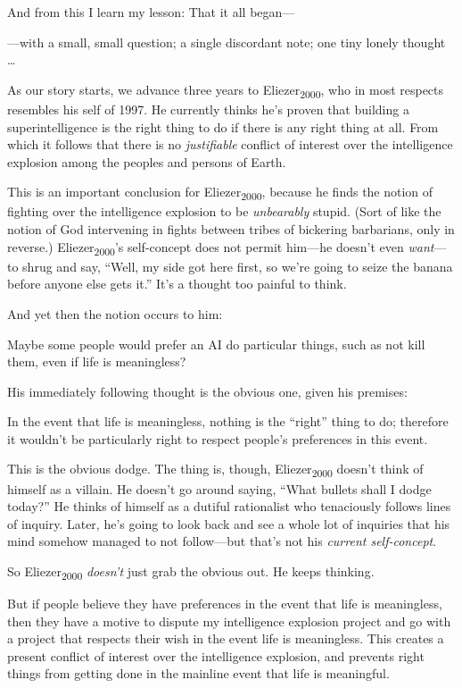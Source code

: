 {
 And from this I learn my lesson: That it all began---}

{
 {}---with a small, small question; a single discordant note; one
tiny lonely thought \ldots}

{
 As our story starts, we advance three years to
Eliezer\textsubscript{2000}, who in most respects resembles his self of
1997. He currently thinks he's proven that building a
superintelligence is the right thing to do if there is any right thing
at all. From which it follows that there is no \textit{justifiable}
conflict of interest over the intelligence explosion among the peoples
and persons of Earth.}

{
 This is an important conclusion for Eliezer\textsubscript{2000},
because he finds the notion of fighting over the intelligence explosion
to be \textit{unbearably} stupid. (Sort of like the notion of God
intervening in fights between tribes of bickering barbarians, only in
reverse.) Eliezer\textsubscript{2000}'s self-concept
does not permit him---he doesn't even
\textit{want}{}---to shrug and say, ``Well, my side
got here first, so we're going to seize the banana
before anyone else gets it.'' It's a
thought too painful to think.}

{
 And yet then the notion occurs to him:}

{
 Maybe some people would prefer an AI do particular things, such as
not kill them, even if life is meaningless?}

{
 His immediately following thought is the obvious one, given his
premises:}

{
 In the event that life is meaningless, nothing is the
``right'' thing to do; therefore it
wouldn't be particularly right to respect
people's preferences in this event.}

{
 This is the obvious dodge. The thing is, though,
Eliezer\textsubscript{2000} doesn't think of himself as
a villain. He doesn't go around saying,
``What bullets shall I dodge
today?'' He thinks of himself as a dutiful
rationalist who tenaciously follows lines of inquiry. Later,
he's going to look back and see a whole lot of
inquiries that his mind somehow managed to not follow---but
that's not his \textit{current self-concept}.}

{
 So Eliezer\textsubscript{2000} \textit{doesn't}
just grab the obvious out. He keeps thinking.}

{
 But if people believe they have preferences in the event that life
is meaningless, then they have a motive to dispute my intelligence
explosion project and go with a project that respects their wish in the
event life is meaningless. This creates a present conflict of interest
over the intelligence explosion, and prevents right things from getting
done in the mainline event that life is meaningful.}

